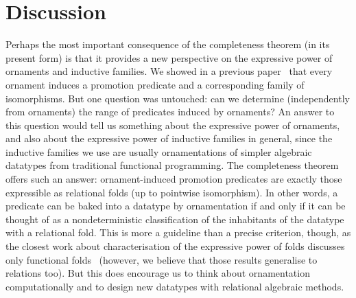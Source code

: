 
\section{Discussion}
\label{sec:equivalence-discussion}


Perhaps the most important consequence of the completeness theorem (in its present form) is that it provides a new perspective on the expressive power of ornaments and inductive families.
We showed in a previous paper~\cite{Ko-pcOrn} that every ornament induces a promotion predicate and a corresponding family of isomorphisms.
But one question was untouched: can we determine (independently from ornaments) the range of predicates induced by ornaments?
An answer to this question would tell us something about the expressive power of ornaments, and also about the expressive power of inductive families in general, since the inductive families we use are usually ornamentations of simpler algebraic datatypes from traditional functional programming.
The completeness theorem offers such an answer: ornament-induced promotion predicates are exactly those expressible as relational folds (up to pointwise isomorphism).
In other words, a predicate can be baked into a datatype by ornamentation if and only if it can be thought of as a nondeterministic classification of the inhabitants of the datatype with a relational fold.
This is more a guideline than a precise criterion, though, as the closest work about characterisation of the expressive power of folds discusses only functional folds~\cite{Gibbons-kernels}
(however, we believe that those results generalise to relations too).
But this does encourage us to think about ornamentation computationally and to design new datatypes with relational algebraic methods.
